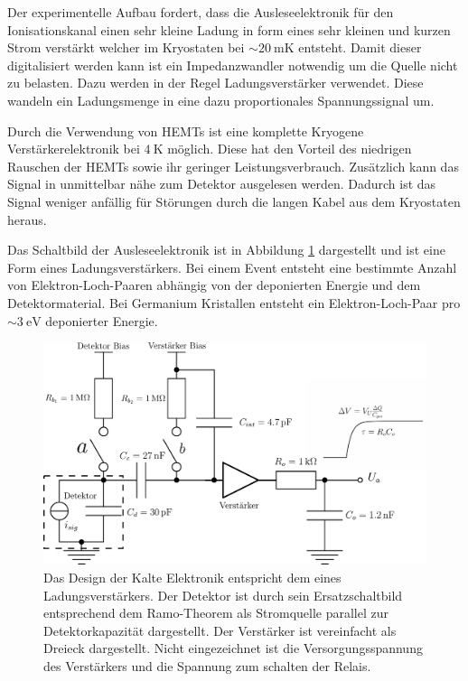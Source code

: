 Der experimentelle Aufbau fordert, dass die Ausleseelektronik für den Ionisationskanal einen sehr kleine Ladung in form eines sehr kleinen und kurzen Strom verstärkt welcher im Kryostaten bei $\sim\SI{20}{\milli\kelvin}$ entsteht.
Damit dieser digitalisiert werden kann ist ein Impedanzwandler notwendig um die Quelle nicht zu belasten.
Dazu werden in der Regel Ladungsverstärker verwendet\cite{Censier2012}.
Diese wandeln ein Ladungsmenge in eine dazu proportionales Spannungssignal um.

Durch die Verwendung von HEMTs ist eine komplette Kryogene Verstärkerelektronik bei $\SI{4}{\kelvin}$ möglich.
Diese hat den Vorteil des niedrigen Rauschen der HEMTs sowie ihr geringer Leistungsverbrauch.
Zusätzlich kann das Signal in unmittelbar nähe zum Detektor ausgelesen werden.
Dadurch ist das Signal weniger anfällig für Störungen durch die langen Kabel aus dem Kryostaten heraus.

Das Schaltbild der Ausleseelektronik ist in Abbildung \ref{fig:Ausleseelektronik} dargestellt und ist eine Form eines Ladungsverstärkers.
Bei einem Event entsteht eine bestimmte Anzahl von Elektron-Loch-Paaren abhängig von der deponierten Energie und dem Detektormaterial.
Bei Germanium Kristallen entsteht ein Elektron-Loch-Paar pro $\sim\SI{3}{\electronvolt}$ deponierter Energie.

\begin{figure}[!t]
\begin{center}
\includegraphics[width=\textwidth]{./fig/Ausleseelektronik.pdf}
\vspace{-0.5cm}
\caption{Das Design der Kalte Elektronik entspricht dem eines Ladungsverstärkers.
Der Detektor ist durch sein Ersatzschaltbild entsprechend dem Ramo-Theorem als Stromquelle parallel zur Detektorkapazität dargestellt.
Der Verstärker ist vereinfacht als Dreieck dargestellt.
Nicht eingezeichnet ist die Versorgungsspannung des Verstärkers und die Spannung zum schalten der Relais.}
\label{fig:Ausleseelektronik}
\end{center}
\end{figure}

